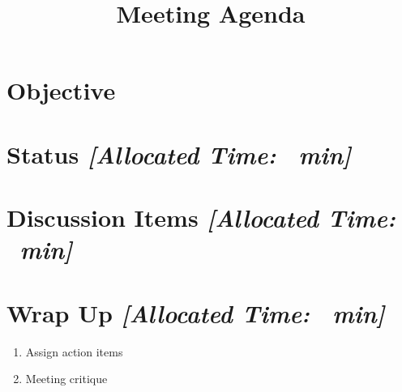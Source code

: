\title{Meeting Agenda}
\maketitle

\section{Objective}



\section{Status \textit{[Allocated Time: \statusTime\ min]}}
\begin{itemize}
    
\end{itemize}

\section{Discussion Items \textit{[Allocated Time: \discTime\ min]}} 
    
    
\section{Wrap Up \textit{[Allocated Time: \wrapTime\ min]}}
\begin{enumerate}
    \item Assign action items
    \item Meeting critique
\end{enumerate}